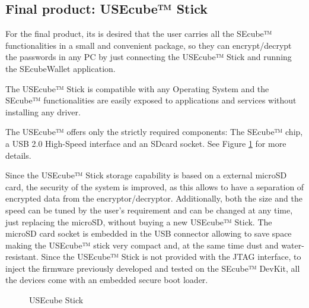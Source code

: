 \subsection{Final product: USEcube™ Stick}

For the final product, its is desired that the user carries all the SEcube™ functionalities in a small and convenient package, so they can encrypt/decrypt the passwords in any PC by just connecting the USEcube™ Stick and running the SEcubeWallet application.

The USEcube™ Stick is compatible with any Operating System and the SEcube™ functionalities are easily exposed to applications and services without installing any driver.

The USEcube™ offers only the strictly required components: The SEcube™ chip, a USB 2.0 High-Speed interface and an SDcard socket. See Figure \ref{fig:USEcube} for more details.


Since the USEcube™ Stick storage capability is based on a external microSD card, the security of the system is improved, as this allows to have a separation of encrypted data from the encryptor/decryptor. Additionally, both the size and the speed can be tuned by the user's requirement and can be changed at any time, just replacing the microSD, without buying a new USEcube™ Stick.
The microSD card socket is embedded in the USB connector allowing to save space making the USEcube™ stick very compact and, at the same time dust
and water-resistant.
Since the USEcube™ Stick is not provided with the JTAG interface, to inject the firmware previously developed and tested on the SEcube™ DevKit, all the devices come with an embedded secure boot loader.


\begin{figure}[ht]
  \centering
  \caption{USEcube Stick}
 \label{fig:USEcube}
\end{figure}

